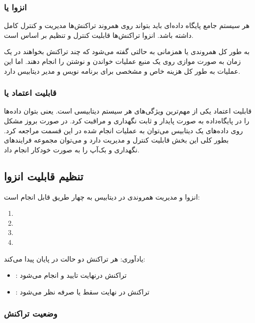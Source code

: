 \documentclass[a4paper]{article}
\begin{document}
\subsubsection{انزوا یا }

هر سیستم جامع پایگاه داده‌ای باید بتواند روی همروند تراکنش‌ها مدیریت و کنترل
کامل داشته باشد. انزوا تراکنش‌ها قابلیت کنترل و تنظیم بر اساس  است.

به طور کل همروندی یا همزمانی به حالتی گفته می‌شود که چند تراکنش بخواهند در یک
زمان به صورت موازی روی یک منبع عملیات خواندن و نوشتن را انجام دهند. اما این
عملیات به طور کل هزینه خاص و مشخصی برای برنامه نویس و مدیر دیتابیس دارد.

\subsubsection{قابلیت اعتماد یا }

قابلیت اعتماد یکی از مهم‌ترین ویژگی‌های هر سیستم دیتابیسی است. یعنی بتوان
داده‌ها را در پایگاه‌داده به صورت پایدار و ثابت نگهداری و مراقبت کرد. در صورت
بروز مشکل روی داده‌های یک دیتابیس می‌توان به عملیات انجام شده در این قسمت مراجعه
کرد. بطور کلی این بخش قابلیت کنترل و مدیریت دارد و می‌توان مجموعه فرایند‌های
نگهداری و بک‌آپ را به صورت خودکار انجام داد.

\subsection{تنظیم قابلیت انزوا}

انزوا و مدیریت همروندی در دیتابیس به چهار طریق قابل انجام است:

\begin{enumerate}
    \item {}
    \item {} 
    \item {}
    \item {}
\end{enumerate}

یادآوری: هر تراکنش دو حالت در پایان پیدا می‌کند:

\begin{itemize}
    \item {}: تراکنش درنهایت تایید و انجام می‌شود
    \item {}: تراکنش در نهایت سقط یا صرفه نظر می‌شود
\end{itemize}

\subsubsection{وضعیت تراکنش}
\end{document}
